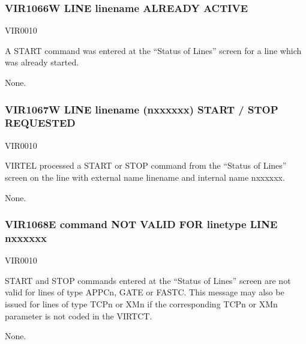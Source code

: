 \documentclass[letterpaper,10pt,english]{sphinxmanual}
\begin{document}
\subsubsection{VIR1066W LINE linename ALREADY ACTIVE}
\label{\detokenize{messages:vir1066w-line-linename-already-active}}\begin{description}
\sphinxAtStartPar
VIR0010

\sphinxAtStartPar
A START command was entered at the “Status of Lines” screen for a line which was already started.

\sphinxAtStartPar
None.

\end{description}


\subsubsection{VIR1067W LINE linename (n\sphinxhyphen{}xxxxxx) START / STOP REQUESTED}
\label{\detokenize{messages:vir1067w-line-linename-n-xxxxxx-start-stop-requested}}\begin{description}
\sphinxAtStartPar
VIR0010

\sphinxAtStartPar
VIRTEL processed a START or STOP command from the “Status of Lines” screen on the line with external name linename and internal name n\sphinxhyphen{}xxxxxx.

\sphinxAtStartPar
None.

\end{description}


\subsubsection{VIR1068E command NOT VALID FOR linetype LINE n\sphinxhyphen{}xxxxxx}
\label{\detokenize{messages:vir1068e-command-not-valid-for-linetype-line-n-xxxxxx}}\begin{description}
\sphinxAtStartPar
VIR0010

\sphinxAtStartPar
START and STOP commands entered at the “Status of Lines” screen are not valid for lines of type APPCn, GATE or FASTC. This message may also be issued for lines of type TCPn or XMn if the corresponding TCPn or XMn parameter is not coded in the VIRTCT.

\sphinxAtStartPar
None.

\end{description}
\end{document}
